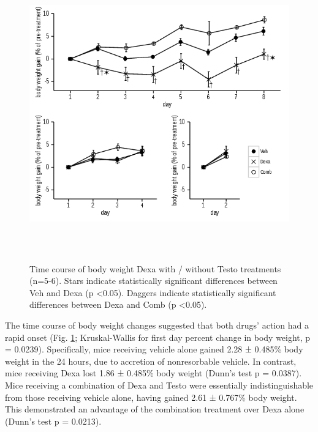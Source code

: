 \documentclass[12pt,english]{report}\usepackage[]{graphicx}\usepackage[]{color}
\newenvironment{knitrout}{}{} %
\begin{document}
\begin{figure}
\begin{knitrout}
\color{fgcolor}
\includegraphics[width=6in,height=5in]{figure/weightcourse-1} 

\end{knitrout}

\protect\caption[Time course of body weight Dexa with / without Testo treatments.]{Time course of body weight Dexa with / without Testo treatments (n=5-6).
Stars indicate statistically significant differences between Veh and
Dexa (p <0.05). Daggers indicate statistically significant differences
between Dexa and Comb (p <0.05).\label{fig:Time-course-of-body-weight}}
\end{figure}


The time course of body weight changes suggested that both drugs'
action had a rapid onset (Fig. \ref{fig:Time-course-of-body-weight};
Kruskal-Wallis for first day percent change in body weight, p = 0.0239).
Specifically, mice receiving vehicle alone gained 2.28
± 0.485\%
body weight in the 24 hours, due to accretion of nonresorbable vehicle.
In contrast, mice receiving Dexa lost 1.86
± 0.485\%
body weight (Dunn's test p = 0.0387).
Mice receiving a combination of Dexa and Testo were essentially indistinguishable
from those receiving vehicle alone, having gained 2.61
± 0.767\%
body weight. This demonstrated an advantage of the combination treatment
over Dexa alone (Dunn's test p = 0.0213).
\end{document}
